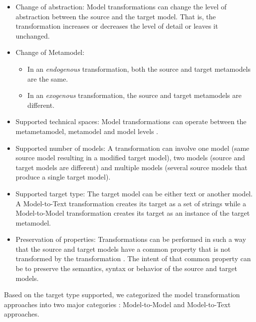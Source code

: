 \begin{itemize}

\item Change of abstraction: Model transformations can change the level of abstraction between the source and the target model. That is, the transformation increases or decreases the level of detail or leaves it unchanged.

\item Change of Metamodel: 
	\begin{itemize}
		\item In an \textit{endogenous} \cite{Visser2005} transformation, both the source and target metamodels are the same.
		\item In an \textit{exogenous} \cite{Visser2005} transformation,  the source and target metamodels are 			different.
	\end{itemize}
\item Supported technical spaces: Model transformations can operate between the metametamodel, metamodel and model levels \cite{OOPSLA2004Bezivin}. 

\item Supported number of models: A transformation can involve one model (same source model resulting in a modified target model), two models (source and target models are different) and multiple models (several source models that produce a single target model).

\item Supported target type: The target model can be either text or another model. A Model-to-Text transformation creates its target as a set of strings while a  Model-to-Model transformation creates its target as an instance of the target metamodel.

\item Preservation of properties: Transformations can be performed in such a way that the source and target models have a common property that is not transformed by the transformation \cite{biehl2010literature}. The intent of that common property can be to preserve the semantics, syntax or behavior of the source and target models. 
\end{itemize}

Based on the target type supported, we categorized the model transformation approaches into two major categories \cite{Czarnecki2006}: Model-to-Model and Model-to-Text approaches. 

